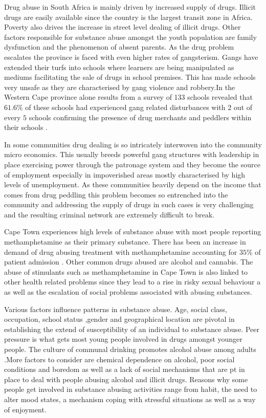 Drug abuse in South Africa  is mainly driven by increased supply of drugs. Illicit drugs are easily available since the country is the largest transit zone in Africa. Poverty also drives the increase in street level dealing of illicit drugs. Other factors responsible for substance abuse amongst the youth population are family dysfunction and the phenomenon of absent parents. As the drug problem escalates the province is faced with even higher rates of gangsterism. Gangs have extended their turfs into schools where learners are being manipulated as mediums facilitating the sale of drugs in school premises. This has made schools very unsafe as they are characterised by gang violence and robbery.In the Western Cape province alone results from a survey of 133 schools revealed that  $61.6 \%$ of these schools had experienced gang related disturbances with $2$ out of every $5$ schools confirming the presence of drug merchants and peddlers within their schools \cite{socialdevelopwc}.

 In some communities drug dealing is so intricately interwoven into the community micro economics. This usually breeds powerful gang structures with leadership in place  exercising power through the patronage system and they become the source of employment especially in impoverished areas mostly characterised by high levels of unemployment. As these communities heavily depend on the income that comes from drug peddling this problem becomes so entrenched into the community and addressing the supply of drugs in such cases is very challenging and the resulting criminal network are extremely difficult to break\cite{modernisation}.
 
 Cape Town experiences high levels of substance abuse with most people reporting methamphetamine as their primary substance.  There has been an increase in demand of drug abusing treatment \cite{kalula2012theoretical} with methamphetamine accounting for $35 \%$ of patient admission . Other common drugs abused are alcohol and cannabis. The abuse of stimulants such as methamphetamine in Cape Town is also linked to other health related problems since they lead to a  rise in risky sexual behaviour \cite{harker2008substance} a as well as the escalation of social problems associated with abusing substances. 
 
 Various factors influence patterns in substance abuse. Age, social class, occupation, school status ,gender and geographical location are pivotal in establishing the extend of susceptibility of an individual to substance abuse. Peer pressure is what gets most young people involved in drugs amongst younger people. The culture of communal drinking promotes alcohol abuse among adults \cite{parry1998substance}.More factors to consider are chemical dependence on alcohol, poor social conditions and boredom as well as  a lack of social mechanisms that are pt in place to deal with people abusing alcohol and illicit drugs. Reasons why some people get involved in substance abusing activities range from habit, the need to alter mood states, a mechanism coping with stressful situations as well as a way of enjoyment.



